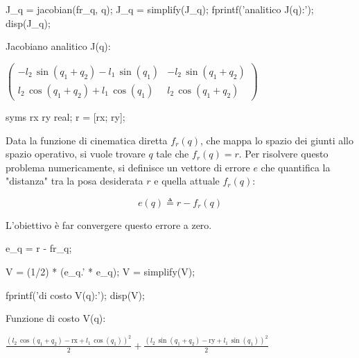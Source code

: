 \documentclass[11pt, a4paper]{article}
\begin{document}
\begin{matlabcode}
J_q = jacobian(fr_q, q);
J_q = simplify(J_q);
fprintf('\nJacobiano analitico J(q):\n');
disp(J_q);
\end{matlabcode}
\begin{matlaboutput}
Jacobiano analitico J(q):
\end{matlaboutput}
\begin{matlabsymbolicoutput}
$\displaystyle \left(\begin{array}{cc}
-l_2 \,\sin \left(q_1 +q_2 \right)-l_1 \,\sin \left(q_1 \right) & -l_2 \,\sin \left(q_1 +q_2 \right)\\
l_2 \,\cos \left(q_1 +q_2 \right)+l_1 \,\cos \left(q_1 \right) & l_2 \,\cos \left(q_1 +q_2 \right)
\end{array}\right)$
\end{matlabsymbolicoutput}
\begin{matlabcode}

syms rx ry real;
r = [rx; ry];
\end{matlabcode}

\begin{par}
\begin{flushleft}
Data la funzione di cinematica diretta $f_r (q)$, che mappa lo spazio dei giunti allo spazio operativo, si vuole trovare $q$ tale che $f_r (q)=r$. Per risolvere questo problema numericamente, si definisce un vettore di errore $e$ che quantifica la "distanza" tra la posa desiderata $r$ e quella attuale $f_r (q)$:
\end{flushleft}
\end{par}

\label{H_2276}
\[
    e(q) \triangleq r - f_r(q)
\]

\begin{par}
\begin{flushleft}
L'obiettivo è far convergere questo errore a zero.
\end{flushleft}
\end{par}

\begin{matlabcode}
e_q = r - fr_q;

V = (1/2) * (e_q.' * e_q);
V = simplify(V);

fprintf('\nFunzione di costo V(q):\n');
disp(V);
\end{matlabcode}
\begin{matlaboutput}
Funzione di costo V(q):
\end{matlaboutput}
\begin{matlabsymbolicoutput}
$\displaystyle \frac{{{\left(l_2 \,\cos \left(q_1 +q_2 \right)-\textrm{rx}+l_1 \,\cos \left(q_1 \right)\right)}}^2 }{2}+\frac{{{\left(l_2 \,\sin \left(q_1 +q_2 \right)-\textrm{ry}+l_1 \,\sin \left(q_1 \right)\right)}}^2 }{2}$
\end{matlabsymbolicoutput}
\end{document}

